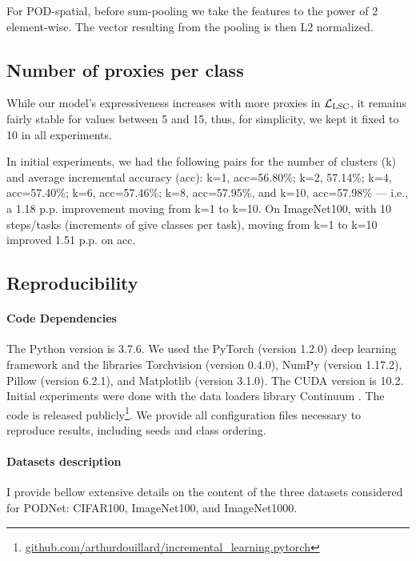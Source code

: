 For POD-spatial, before sum-pooling we take the features to the power of 2 element-wise. The vector
resulting from the pooling is then L2 normalized.

\subsection{Number of proxies per class}

While our model's expressiveness increases with more proxies in $\mathcal{L}_\text{LSC}$, it remains fairly
stable for values between 5 and 15, thus, for simplicity, we kept it fixed to 10 in all experiments.

In initial experiments, we had the following pairs for the number of clusters (k) and average
incremental accuracy (acc): k=1, acc=56.80\%; k=2, 57.14\%; k=4, acc=57.40\%; k=6, acc=57.46\%; k=8,
acc=57.95\%, and k=10, acc=57.98\% --- i.e., a 1.18 p.p. improvement moving from k=1 to k=10. On
ImageNet100, with 10 steps/tasks (increments of give classes per task), moving from k=1 to k=10
improved 1.51 p.p. on acc.

\subsection{Reproducibility}
\label{sec:appendix_podnet_repro}

\paragraph{Code Dependencies} The Python version is 3.7.6. We used the PyTorch
\citep{paszke2017pytorch} (version 1.2.0) deep learning framework and the libraries Torchvision
(version 0.4.0), NumPy \citep{oliphant2006numpy} (version 1.17.2), Pillow (version 6.2.1), and
Matplotlib \citep{hunter2007matplotlib} (version 3.1.0). The CUDA version is 10.2. Initial
experiments were done with the data loaders library Continuum \citep{douillardlesort2021continuum}.
The code is released publicly\footnote{\href{https://github.com/arthurdouillard/incremental_learning.pytorch}{\scriptsize{github.com/arthurdouillard/incremental\_learning.pytorch}}}.
We provide all configuration files necessary to reproduce results, including seeds and class
ordering.

\paragraph{Datasets description} I provide bellow extensive details on the content of the three
datasets considered for PODNet: CIFAR100, ImageNet100, and ImageNet1000.

